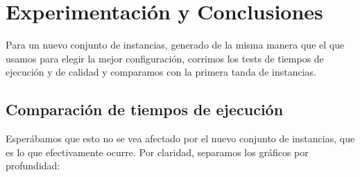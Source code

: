 \section{Experimentación y Conclusiones}

Para un nuevo conjunto de instancias, generado de la misma manera que el que usamos para elegir la mejor configuración, corrimos los tests de tiempos de ejecución y de calidad y comparamos con la primera tanda de instancias.

\subsection{Comparación de tiempos de ejecución}

Esperábamos que esto no se vea afectado por el nuevo conjunto de instancias, que es lo que efectivamente ocurre. Por claridad, separamos los gráficos por profundidad:

\begin{figure}[H]
    \begin{minipage}[t]{\linewidth}
		\centering
		\label{fig:ejercicio-6-tiempos-grasp-2-2}
    \end{minipage}
\end{figure}

